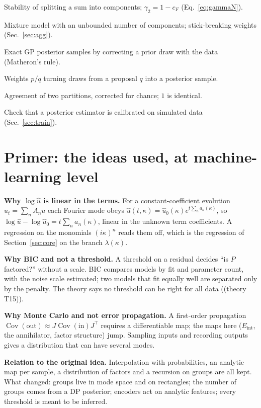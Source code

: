 \documentclass[11pt,a4paper]{article}
\theoremstyle{definition}
\newcommand{\Eint}{E_{\mathrm{int}}}
\newcommand{\thy}[1]{\textcolor{cG}{\textsf{\footnotesize(theory #1)}}}
\DeclareMathOperator{\Cov}{Cov}
\begin{document}
\begin{description}[leftmargin=4.2cm,labelwidth=4.0cm,itemsep=3pt]
\item[$\gamma_N$, Friedrichs angle] Stability of splitting a sum into components; $\gamma_2=1-c_F$ (Eq.~\ref{eq:gammaN}).
\item[Dirichlet-process mixture] Mixture model with an unbounded number of components; stick-breaking weights (Sec.~\ref{sec:agg}).
\item[Pathwise conditioning] Exact GP posterior samples by correcting a prior draw with the data (Matheron's rule).
\item[Importance reweighting] Weights $p/q$ turning draws from a proposal $q$ into a posterior sample.
\item[Adjusted Rand Index] Agreement of two partitions, corrected for chance; $1$ is identical.
\item[Simulation-based calibration] Check that a posterior estimator is calibrated on simulated data (Sec.~\ref{sec:train}).
\end{description}

\section{Primer: the ideas used, at machine-learning level}\label{app:primer}
\textbf{Why $\log\hat u$ is linear in the terms.} For a constant-coefficient evolution $u_t=\sum_nA_nu$ each Fourier mode obeys $\hat u(t,\kappa)=\hat u_0(\kappa)e^{t\sum_na_n(\kappa)}$, so $\log\hat u-\log\hat u_0=t\sum_na_n(\kappa)$, linear in the unknown term coefficients. A regression on the monomials $(i\kappa)^n$ reads them off, which is the regression of Section~\ref{sec:core} on the branch $\lambda(\kappa)$.

\medskip\textbf{Why BIC and not a threshold.} A threshold on a residual decides ``is $P$ factored?'' without a scale. BIC compares models by fit and parameter count, with the noise scale estimated; two models that fit equally well are separated only by the penalty. The theory says no threshold can be right for all data (\thy{T15}).

\medskip\textbf{Why Monte Carlo and not error propagation.} A first-order propagation $\Cov(\text{out})\approx J\Cov(\text{in})J^{\top}$ requires a differentiable map; the maps here ($\Eint$, the annihilator, factor structure) jump. Sampling inputs and recording outputs gives a distribution that can have several modes.

\medskip\textbf{Relation to the original idea.} Interpolation with probabilities, an analytic map per sample, a distribution of factors and a recursion on groups are all kept. What changed: groups live in mode space and on rectangles; the number of groups comes from a DP posterior; encoders act on analytic features; every threshold is meant to be inferred.
\end{document}
